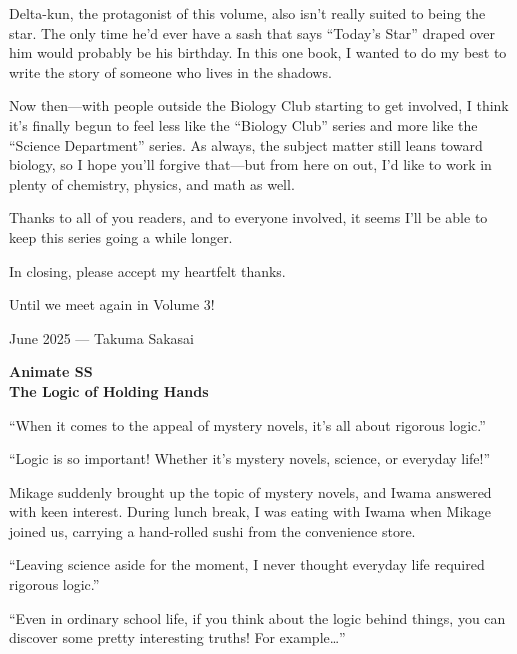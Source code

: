 \documentclass[
    a4paper,
    12pt,
    twoside,
    openany,
    UTF8,
    fontset=windows
]{ctexbook}
\begin{document}
Delta-kun, the protagonist of this volume, also isn't really suited to being the star. The only time he'd ever have a sash that says ``Today's Star'' draped over him would probably be his birthday. In this one book, I wanted to do my best to write the story of someone who lives in the shadows.

Now then---with people outside the Biology Club starting to get involved, I think it's finally begun to feel less like the ``Biology Club'' series and more like the ``Science Department'' series. As always, the subject matter still leans toward biology, so I hope you'll forgive that---but from here on out, I'd like to work in plenty of chemistry, physics, and math as well.

Thanks to all of you readers, and to everyone involved, it seems I'll be able to keep this series going a while longer.

In closing, please accept my heartfelt thanks.

Until we meet again in Volume 3!

\begin{flushright}
    June 2025 --- Takuma Sakasai
\end{flushright}

\clearpage
\thispagestyle{plain}
\begin{center}
    \large\bfseries
    Animate SS\\
    The Logic of Holding Hands
\end{center}
\label{sec:a}
\vspace{1cm}

``When it comes to the appeal of mystery novels, it's all about rigorous logic.''

``Logic is so important! Whether it's mystery novels, science, or everyday life!''

Mikage suddenly brought up the topic of mystery novels, and Iwama answered with keen interest. During lunch break, I was eating with Iwama when Mikage joined us, carrying a hand-rolled sushi from the convenience store.

``Leaving science aside for the moment, I never thought everyday life required rigorous logic.''

``Even in ordinary school life, if you think about the logic behind things, you can discover some pretty interesting truths! For example\dots''
\end{document}
